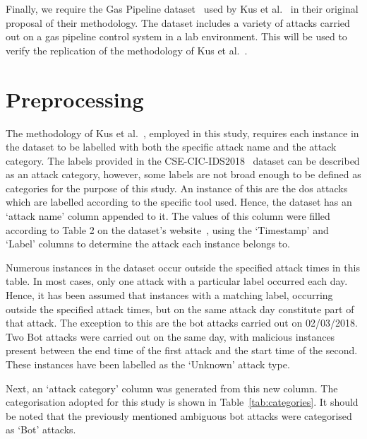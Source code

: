 Finally, we require the Gas Pipeline dataset~\cite{gas_pipeline_dataset} used
by Kus et al.~\cite{Kus} in their original proposal of their methodology. The
dataset includes a variety of attacks carried out on a gas pipeline control
system in a lab environment. This will be used to verify the replication of the
methodology of Kus et al.~\cite{Kus}.

\section{Preprocessing}%
\label{sec:preprocessing}

The methodology of Kus et al.~\cite{Kus}, employed in this study, requires each
instance in the dataset to be labelled with both the specific attack name and
the attack category. The labels provided in the CSE-CIC-IDS2018~\cite{cic2018}
dataset can be described as an attack category, however, some labels are not
broad enough to be defined as categories for the purpose of this study. An
instance of this are the \gls{dos} attacks which are labelled according to the
specific tool used. Hence, the dataset has an `attack name' column appended to
it. The values of this column were filled according to Table 2 on the dataset's
website~\cite{cic2018}, using the `Timestamp' and `Label' columns to determine
the attack each instance belongs to.

Numerous instances in the dataset occur outside the specified attack times in
this table. In most cases, only one attack with a particular label occurred
each day. Hence, it has been assumed that instances with a matching label,
occurring outside the specified attack times, but on the same attack day
constitute part of that attack. The exception to this are the bot attacks
carried out on 02/03/2018. Two Bot attacks were carried out on the same day,
with malicious instances present between the end time of the first attack and
the start time of the second. These instances have been labelled as the
`Unknown' attack type.

Next, an `attack category' column was generated from this new column. The
categorisation adopted for this study is shown in Table~\ref{tab:categories}.
It should be noted that the previously mentioned ambiguous bot attacks were
categorised as `Bot' attacks.

